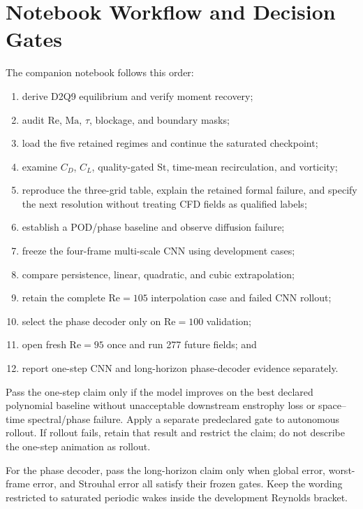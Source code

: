 \documentclass[11pt]{article}
\newcommand{\Rey}{\mathrm{Re}}
\newcommand{\Ma}{\mathrm{Ma}}
\newcommand{\St}{\mathrm{St}}
\begin{document}
\section{Notebook Workflow and Decision Gates}
The companion notebook follows this order:
\begin{enumerate}
\item derive D2Q9 equilibrium and verify moment recovery;
\item audit $\Rey$, $\Ma$, $\tau$, blockage, and boundary masks;
\item load the five retained regimes and continue the saturated checkpoint;
\item examine $C_D$, $C_L$, quality-gated $\St$, time-mean recirculation, and vorticity;
\item reproduce the three-grid table, explain the retained formal failure, and
specify the next resolution without treating CFD fields as qualified labels;
\item establish a POD/phase baseline and observe diffusion failure;
\item freeze the four-frame multi-scale CNN using development cases;
\item compare persistence, linear, quadratic, and cubic extrapolation;
\item retain the complete $\Rey=105$ interpolation case and failed CNN rollout;
\item select the phase decoder only on $\Rey=100$ validation;
\item open fresh $\Rey=95$ once and run 277 future fields; and
\item report one-step CNN and long-horizon phase-decoder evidence separately.
\end{enumerate}

\begin{evidencebox}
Pass the one-step claim only if the model improves on the best declared
polynomial baseline without unacceptable downstream enstrophy loss or
space--time spectral/phase failure. Apply a separate predeclared gate to
autonomous rollout. If rollout fails, retain that result and restrict the claim;
do not describe the one-step animation as rollout.
\end{evidencebox}

For the phase decoder, pass the long-horizon claim only when global error,
worst-frame error, and Strouhal error all satisfy their frozen gates. Keep the
wording restricted to saturated periodic wakes inside the development
Reynolds bracket.
\end{document}

